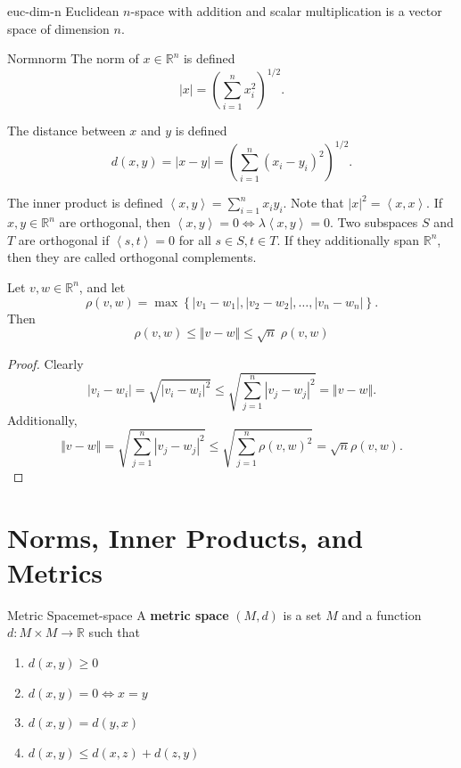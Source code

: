 \documentclass[10pt]{report}
\begin{document}
\begin{thrm}{}{euc-dim-n}
	Euclidean $n$-space with addition and scalar multiplication is a vector space of dimension $n$.
\end{thrm}

\begin{defn}{Norm}{norm}
	The norm of $x \in \mathbb{R}^n$ is defined
	\[
		|x| = \left( \sum_{i=1}^{n} x_i^2 \right)^{1/2}.
	\] 
\end{defn}
The distance between $x$ and $y$ is defined \[d(x,y) = |x-y| = \left( \sum_{i=1}^{n} (x_i-y_i)^2 \right)^{1/2}.\]

The inner product is defined $\left\langle x,y \right\rangle = \sum_{i=1}^{n} x_i y_i$. Note that $|x|^2 = \left\langle x,x \right\rangle$. If $x,y \in \mathbb{R}^n$ are orthogonal, then $\left\langle x,y \right\rangle=0 \iff \lambda \left\langle x,y \right\rangle=0$. Two subspaces $S$ and $T$ are orthogonal if $\left\langle s,t \right\rangle=0$ for all $s \in S, t\in T$. If they additionally span $\mathbb{R}^n$, then they are called orthogonal complements.

\begin{prop}
	\label{root-thing}
	Let $v,w \in \mathbb{R}^n$, and let
	\[
		\rho(v,w) = \max \left\{ |v_1-w_1|, |v_2-w_2|, \dots, |v_n-w_n| \right\}.
	\]
	Then
	 \[
		 \rho(v,w) \leq \Vert{v-w}\Vert \leq \sqrt{n} \; \rho(v,w)
	\] 
\end{prop}
\begin{proof}
	Clearly
	\[
	|v_i-w_i| = \sqrt{|v_i-w_i|^2} \leq \sqrt{\sum_{j=1}^{n} |v_j - w_j|^2} = \Vert{v-w}\Vert.
	\] 
	Additionally,
	\[
		\Vert{v-w}\Vert = \sqrt{\sum_{j=1}^{n} |v_j-w_j|^2} \leq \sqrt{\sum_{j=1}^{n} \rho(v,w)^2} = \sqrt{n} \rho(v,w).
	\] 
\end{proof}



\section{Norms, Inner Products, and Metrics}
\begin{defn}{Metric Space}{met-space}
	A \textbf{metric space} $(M,d)$ is a set $M$ and a function $d: M \times M \to \mathbb{R}$ such that
	\begin{enumerate}
		\item $d(x,y) \geq 0$ 
		\item $d(x,y) = 0 \iff x=y$ 
		\item $d(x,y) = d(y,x)$ 
		\item $d(x,y) \leq d(x,z) + d(z,y)$
	\end{enumerate}
\end{defn}
\end{document}
